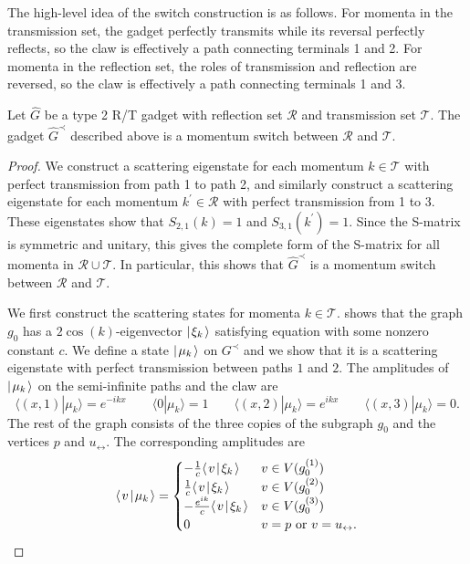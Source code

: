 \documentclass[../thesis-main/thesis-main]{subfiles}
\begin{document}
The high-level idea of the switch construction is as follows.  For momenta in the transmission set, the gadget perfectly transmits while its reversal perfectly reflects, so the claw is effectively a path connecting terminals 1 and 2.  For momenta in the reflection set, the roles of transmission and reflection are reversed, so the claw is effectively a path connecting terminals 1 and 3.


\begin{lemma}\label{lem:mom_switch_construction}
Let $\hat{G}$ be a type 2 R/T gadget with reflection set $\mathcal{R}$ and transmission set $\mathcal{T}$.  The gadget $\hat{G}^{\prec}$ described above is a momentum switch between $\mathcal{R}$ and $\mathcal{T}$.
\end{lemma}


\begin{proof}

We construct a scattering eigenstate for each momentum $k\in \mathcal{T}$ with perfect transmission from path 1 to path 2, and similarly construct a scattering eigenstate for each momentum $k^{\prime}\in \mathcal{R}$ with perfect transmission from 1 to 3.  These eigenstates show that $S_{2,1}(k) = 1$ and $S_{3,1}(k^\prime) = 1$. Since the S-matrix is symmetric and unitary, this gives the complete form of the S-matrix for all momenta in $\mathcal{R}\cup\mathcal{T}$.  In particular, this shows that $\hat{G}^{\prec}$ is a momentum switch between $\mathcal{R}$ and $\mathcal{T}$.

We first construct the scattering states for momenta $k\in \mathcal{T}$.   shows that the graph $g_0$ has a $2\cos(k)$-eigenvector $|\mspace{2mu} \xi_k \mspace{2mu} \rangle$ satisfying equation  with some nonzero constant $c$. We define a state $|\mspace{2mu} \mu_k \mspace{2mu} \rangle$ on $G^{\prec}$ and we show that it is a scattering eigenstate with perfect transmission between paths $1$ and $2$.   The amplitudes of $|\mspace{2mu} \mu_k \mspace{2mu} \rangle$ on the semi-infinite paths and the claw are
\[
  \langle (x,1)|\mu_k\rangle=e^{-ikx} \qquad 
  \langle 0|\mu_k\rangle=1 \qquad 
  \langle (x,2)|\mu_k\rangle=e^{ikx} \qquad
  \langle (x,3)|\mu_k\rangle=0.
\]
The rest of the graph consists of the three copies of the subgraph $g_0$ and the vertices $p$ and $u_{\leftrightarrow}$. The corresponding amplitudes are
\[
  \langle\mspace{2mu} v \mspace{2mu} | \mspace{2mu} \mu_k\mspace{2mu} \rangle =
  \begin{cases}
	  -\frac{1}{c}\langle\mspace{2mu} v \mspace{2mu} | \mspace{2mu} \xi_k\mspace{2mu} \rangle & v\in V(g^{(1)}_0) \\
    \frac{1}{c}\langle\mspace{2mu} v \mspace{2mu} | \mspace{2mu} \xi_k\mspace{2mu} \rangle & v \in V(g^{(2)}_0) \\
	  -\frac{e^{ik}}{c} \langle\mspace{2mu} v \mspace{2mu} | \mspace{2mu} \xi_k\mspace{2mu} \rangle & v \in V(g^{(3)}_0) \\
  	0 & v=p \text{ or } v=u_{\leftrightarrow}.
  \end{cases}
\]


\end{proof}
\end{document}
